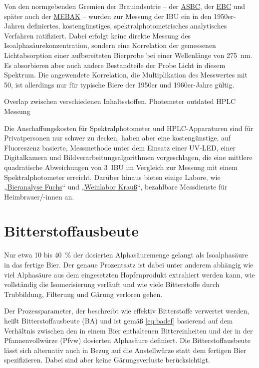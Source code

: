 \documentclass[a4paper,parskip=half]{scrartcl}
\begin{document}
Von den normgebenden Gremien der Brauindsutrie – der \href{https://www.asbcnet.org}{ASBC}, der \href{https://europeanbreweryconvention.eu}{EBC} und später auch der \href{https://www.mebak.org}{MEBAK} – wurden zur Messung der IBU ein in den 1950er-Jahren definiertes,  kostengünstiges, spektralphotometrisches analytisches Verfahren ratifiziert. Dabei erfolgt keine direkte Messung des Isoalphasäurekonzentration, sondern eine Korrelation der gemessenen Lichtabsorption einer aufbereiteten Bierprobe bei einer Wellenlänge von 275~nm. Es absorbieren aber auch andere Bestandteile der Probe Licht in diesem Spektrum. Die angewendete Korrelation, die Multiplikation des Messwertes mit 50, ist allerdings nur für typische Biere der 1950er und 1960er-Jahre gültig. \parencites{ASBC2011}{Hosom2017}

\parencite[5\psq]{Malowicki2005}
Overlap zwischen verschiedenen Inhaltsstoffen. Photemeter outdated HPLC Messung 

Die Anschaffungskosten für Spektralphotometer und HPLC-Apparaturen sind für Privatpersonen nur schwer zu decken. \textcite{Calado2019} haben aber eine kostengünstige, auf Fluoreszenz basierte, Messmethode unter dem Einsatz einer UV-LED, einer Digitalkamera und Bildverarbeitungsalgorithmen vorgeschlagen, die eine mittlere quadratische Abweichungen von 3~IBU im Vergleich zur Messung mit einem Spektralphotometer erreicht. Darüber hinaus bieten einige Labore, wie „\href{https://bieranalyse.de}{Bieranalyse Fuchs}“ und „\href{https://www.weinlabor-krauss.de}{Weinlabor Krauß}“, bezahlbare Messdienste für Heimbrauer/-innen an.


\section*{Bitterstoffausbeute}

Nur etwa 10 bis 40~\% der dosierten Alphasäuremenge gelangt als Isoalphasäure in das fertige Bier. Der genaue Prozentsatz ist dabei unter anderem abhängig wie viel Alphasäure aus dem eingesetzten Hopfenprodukt extrahiert werden kann, wie vollständig die Isomerisierung verläuft und wie viele Bitterstoffe durch Trubbildung, Filterung und Gärung verloren gehen. \parencite[9]{Malowicki2005}

Der Prozessparameter, der beschreibt wie effektiv Bitterstoffe verwertet werden, heißt Bitterstoffausbeute (BA) und ist gemäß \autoref{eq:badef} basierend auf dem Verhältnis zwischen den in einem Bier enthaltenen Bittereinheiten und der in der Pfannenvollwürze (Pfvw) dosierten Alphasäure definiert. Die Bitterstoffausbeute lässt sich alternativ auch in Bezug auf die Anstellwürze statt dem fertigen Bier spezifizieren. Dabei sind aber keine Gärungsverluste berücksichtigt. \parencite[163]{Annemueller2015} 
\end{document}
